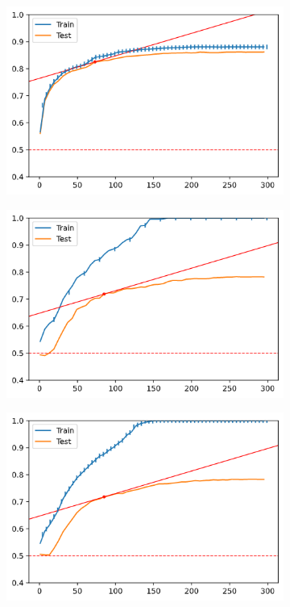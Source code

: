 \begin{figure}[H]
\begin{subfigure}[b]{0.32\linewidth}
        \includegraphics[width=\linewidth]{img/300-s5-05v.png}
    \end{subfigure}
    \begin{subfigure}[b]{0.32\linewidth}
        \includegraphics[width=\linewidth]{img/300-s20-p01-pre.png}
    \end{subfigure}
    \begin{subfigure}[b]{0.32\linewidth}
        \includegraphics[width=\linewidth]{img/300-s5-p01-pre.png}

\end{subfigure}
\end{figure}
